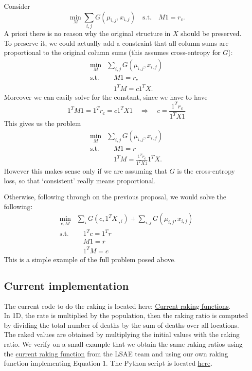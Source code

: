 \documentclass{tex/note}
\begin{document}
Consider
\[
\min_M \sum_{i,j} G(\mu_{i,j}, x_{i,j}) \quad  \mbox{s.t.} \quad 
M 1 = r_c. 
\]
A priori there is no reason why the original structure in $X$ should be preserved. To preserve it, we could actually add a constraint that all column sums are proportional to the original column sums (this assumes cross-entropy for $G$): 
\[
\begin{aligned}
\min_M &  \sum_{i,j} G(\mu_{i,j}, x_{i,j})  \\
\mbox{s.t.} & \quad M 1 = r_c \\
            & \quad 1^TM = c 1^TX.
\end{aligned}
\]
Moreover we can easily solve for the constant, since we have to have 
\[
1^TM1 = 1^Tr_c = c 1^TX1 \quad \Rightarrow \quad c = \frac{1^Tr_c}{1^TX1}
\]
This gives us the problem 
\[
\begin{aligned}
\min_M &  \sum_{i,j} G(\mu_{i,j}, x_{i,j})  \\
\mbox{s.t.} & \quad M 1 = r \\
            & \quad 1^TM = \frac{1^Tr_c}{1^TX1} 1^TX.
\end{aligned}
\]
However this makes sense only if we are assuming that $G$ is the cross-entropy loss, so that `consistent' really means proportional. 

Otherwise, following through on the previous proposal, we would solve the following: 
\[
\begin{aligned}
\min_{c, M} &\sum_i G(c, 1^TX_{\cdot, i}) + \sum_{i,j} G(\mu_{i,j}, x_{i,j})\\
\mbox{s.t.} & \quad 1^Tc = 1^Tr\\ 
& \quad M 1 = r \\
& \quad 1^T M = c 
\end{aligned}
\]
This is a simple example of the full problem posed above. 

\subsection{Current implementation}

The current code to do the raking is located here: \href{https://stash.ihme.washington.edu/projects/LSAE/repos/sae.shared/browse/R/rake.r}{Current raking functions}. \\

In 1D, the rate is multiplied by the population, then the raking ratio is computed by dividing the total number of deaths by the sum of deaths over all locations. The raked values are obtained by multiplying the initial values with the raking ratio. We verify on a small example that we obtain the same raking ratios using the \href{https://stash.ihme.washington.edu/projects/LSAE/repos/sae.shared/browse/R/rake.r}{current raking function} from the LSAE team and using our own raking function implementing Equation 1. The Python script is located \href{https://github.com/ADucellierIHME/raking_1Dtoy/blob/main/compare_with_current_raking_function.py}{here}.
\end{document}
